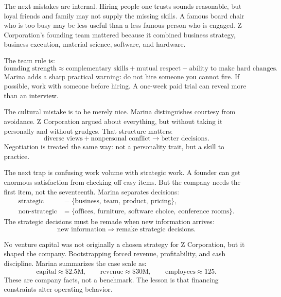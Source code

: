 The next mistakes are internal. Hiring people one trusts sounds reasonable, but loyal friends and family may not supply the missing skills. A famous board chair who is too busy may be less useful than a less famous person who is engaged. Z Corporation's founding team mattered because it combined business strategy, business execution, material science, software, and hardware.

The team rule is:
\begin{equation}
\text{founding strength}
\approx
\text{complementary skills}
+
\text{mutual respect}
+
\text{ability to make hard changes}.
\end{equation}
Marina adds a sharp practical warning: do not hire someone you cannot fire. If possible, work with someone before hiring. A one-week paid trial can reveal more than an interview.

The cultural mistake is to be merely nice. Marina distinguishes courtesy from avoidance. Z Corporation argued about everything, but without taking it personally and without grudges. That structure matters:
\begin{equation}
\text{diverse views}
+
\text{nonpersonal conflict}
\longrightarrow
\text{better decisions}.
\end{equation}
Negotiation is treated the same way: not a personality trait, but a skill to practice.

The next trap is confusing work volume with strategic work. A founder can get enormous satisfaction from checking off easy items. But the company needs the first item, not the seventeenth. Marina separates decisions:
\begin{align}
\text{strategic}
&=
\{\text{business},\ \text{team},\ \text{product},\ \text{pricing}\},\\
\text{non-strategic}
&=
\{\text{offices},\ \text{furniture},\ \text{software choice},\ \text{conference rooms}\}.
\end{align}
The strategic decisions must be remade when new information arrives:
\begin{equation}
\text{new information}
\Rightarrow
\text{remake strategic decisions}.
\end{equation}

No venture capital was not originally a chosen strategy for Z Corporation, but it shaped the company. Bootstrapping forced revenue, profitability, and cash discipline. Marina summarizes the case scale as:
\begin{equation}
\text{capital}\approx \$2.5\text{M},
\qquad
\text{revenue}\approx \$30\text{M},
\qquad
\text{employees}\approx 125.
\end{equation}
These are company facts, not a benchmark. The lesson is that financing constraints alter operating behavior.

